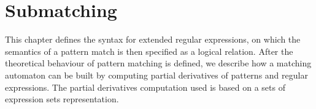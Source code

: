 \chapter{Submatching}

This chapter defines the syntax for extended regular expressions, on which the
semantics of a pattern match is then specified as a logical relation.  After the
theoretical behaviour of pattern matching is defined, we describe how a matching
automaton can be built by computing partial derivatives of patterns and regular
expressions. The partial derivatives computation used is based on a sets of
expression sets representation.








